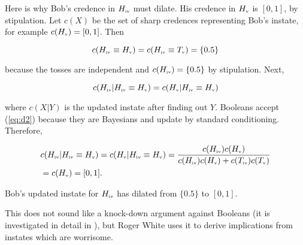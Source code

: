 \documentclass[11pt]{article}
\begin{document}
Here is why Bob's credence in $H_{\mbox{\tiny{iv}}}$ must dilate. His
credence in $H_{\mbox{\tiny{v}}}$ is $[0,1]$, by stipulation. Let
$c(X)$ be the set of sharp credences representing Bob's instate, for
example $c(H_{\mbox{\tiny{v}}})=[0,1]$. Then

\begin{equation}
  \label{eq:d1}
  c(H_{\mbox{\tiny{iv}}}\equiv{}H_{\mbox{\tiny{v}}})=c(H_{\mbox{\tiny{iv}}}\equiv{}T_{\mbox{\tiny{v}}})=\{0.5\}
\end{equation}

because the tosses are independent and
$c(H_{\mbox{\tiny{iv}}})=\{0.5\}$ by stipulation. Next,

\begin{equation}
  \label{eq:d2}
  c(H_{\mbox{\tiny{iv}}}|H_{\mbox{\tiny{iv}}}\equiv{}H_{\mbox{\tiny{v}}})=c(H_{\mbox{\tiny{v}}}|H_{\mbox{\tiny{iv}}}\equiv{}H_{\mbox{\tiny{v}}})
\end{equation}

where $c(X|Y)$ is the updated instate after finding out $Y$. Booleans
accept (\ref{eq:d2}) because they are Bayesians and update by standard
conditioning. Therefore,

\begin{align}
  \label{eq:d3}
  &c(H_{\mbox{\tiny{iv}}}|H_{\mbox{\tiny{iv}}}\equiv{}H_{\mbox{\tiny{v}}})=c(H_{\mbox{\tiny{v}}}|H_{\mbox{\tiny{iv}}}\equiv{}H_{\mbox{\tiny{v}}})=\frac{c(H_{\mbox{\tiny{iv}}})c(H_{\mbox{\tiny{v}}})}{c(H_{\mbox{\tiny{iv}}})c(H_{\mbox{\tiny{v}}})+c(T_{\mbox{\tiny{iv}}})c(T_{\mbox{\tiny{v}}})} \notag \\
  &=c(H_{\mbox{\tiny{v}}})=[0,1].
\end{align}

Bob's updated instate for $H_{\mbox{\tiny{iv}}}$ has dilated from
$\{0.5\}$ to $[0,1]$.

This does not sound like a knock-down argument against Booleans (it is
investigated in detail in ), but
Roger White uses it to derive implications from instates which are
worrisome.
\end{document}

